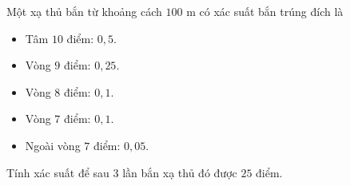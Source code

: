 \begin{bt}%
	Một xạ thủ bắn từ khoảng cách $100$ m có xác suất bắn trúng đích là
	\begin{itemize}
	\item Tâm $10$ điểm: $0{,}5$.
	\item  Vòng $9$ điểm: $0{,}25$.
	\item Vòng $8$ điểm: $0{,}1$.
	\item Vòng $7$ điểm: $0{,}1$.
	\item Ngoài vòng $7$ điểm: $0{,}05$.
	\end{itemize}
	Tính xác suất để sau $3$ lần bắn xạ thủ đó được $25$ điểm.
\end{bt}
